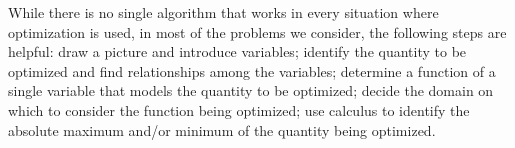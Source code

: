 \begin{summary}
\item While there is no single algorithm that works in every situation where optimization is used, in most of the problems we consider, the following steps are helpful:  draw a picture and introduce variables; identify the quantity to be optimized and find relationships among the variables; determine a function of a single variable that models the quantity to be optimized; decide the domain on which to consider the function being optimized; use calculus to identify the absolute maximum and/or minimum of the quantity being optimized.
\end{summary}

\nin \hrulefill

 

\clearpage
